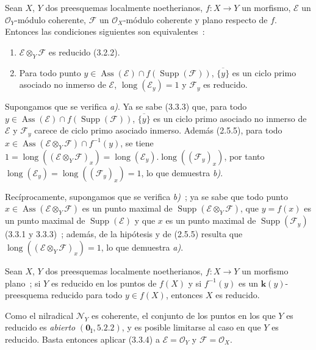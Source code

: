\begin{proposition}[3.3.4]
\label{IV.2.3.3.4-fr}
Sean $X$, $Y$ dos preesquemas localmente noetherianos, $f:X\to Y$ un
morfismo, $\mathcal E$ un $\mathcal O_Y$-módulo coherente, $\mathcal F$ un
$\mathcal O_X$-módulo coherente y plano respecto de $f$. Entonces las
condiciones siguientes son equivalentes~:
\begin{enumerate}
\item[\emph{a)}] $\mathcal E\otimes_Y\mathcal F$ es reducido \textup{(3.2.2)}.
\item[\emph{b)}] Para todo punto
$y\in\operatorname{Ass}(\mathcal E)\cap f(\operatorname{Supp}(\mathcal F))$,
$\overline{\{y\}}$ es un ciclo primo asociado no inmerso de $\mathcal E$,
$\operatorname{long}(\mathcal E_y)=1$ y $\mathcal F_y$ es reducido.
\end{enumerate}
\end{proposition}

Supongamos que se verifica \emph{a)}. Ya se sabe (3.3.3) que, para todo
$y\in\operatorname{Ass}(\mathcal E)\cap f(\operatorname{Supp}(\mathcal F))$,
$\overline{\{y\}}$ es un ciclo primo asociado no inmerso de $\mathcal E$ y
$\mathcal F_y$ carece de ciclo primo asociado inmerso. Además (2.5.5), para
todo $x\in\operatorname{Ass}(\mathcal E\otimes_Y\mathcal F)\cap f^{-1}(y)$,
se tiene
$1=\operatorname{long}((\mathcal E\otimes_Y\mathcal F)_x)
=\operatorname{long}(\mathcal E_y).\operatorname{long}((\mathcal F_y)_x)$,
por tanto $\operatorname{long}(\mathcal E_y)
=\operatorname{long}((\mathcal F_y)_x)=1$, lo que demuestra \emph{b)}.

Recíprocamente, supongamos que se verifica \emph{b)}~; ya se sabe que todo
punto $x\in\operatorname{Ass}(\mathcal E\otimes_Y\mathcal F)$ es un punto
maximal de $\operatorname{Supp}(\mathcal E\otimes_Y\mathcal F)$, que
$y=f(x)$ es un punto maximal de $\operatorname{Supp}(\mathcal E)$ y que $x$
es un punto maximal de $\operatorname{Supp}(\mathcal F_y)$ (3.3.1 y 3.3.3)~;
además, de la hipótesis y de (2.5.5) resulta que
$\operatorname{long}((\mathcal E\otimes_Y\mathcal F)_x)=1$, lo que demuestra
\emph{a)}.

\begin{corollary}[3.3.5]
\label{IV.2.3.3.5-fr}
Sean $X$, $Y$ dos preesquemas localmente noetherianos, $f:X\to Y$ un
morfismo plano~; si $Y$ es reducido en los puntos de $f(X)$ y si $f^{-1}(y)$
es un $\boldsymbol{k}(y)$-preesquema reducido para todo $y\in f(X)$, entonces $X$ es
reducido.
\end{corollary}

Como el nilradical $\mathcal N_Y$ es coherente, el conjunto de los puntos en
los que $Y$ es reducido es \emph{abierto} $(\mathbf{0}_{\mathrm I},5.2.2)$, y es posible
limitarse al caso en que $Y$ es reducido. Basta entonces aplicar (3.3.4) a
$\mathcal E=\mathcal O_Y$ y $\mathcal F=\mathcal O_X$.
